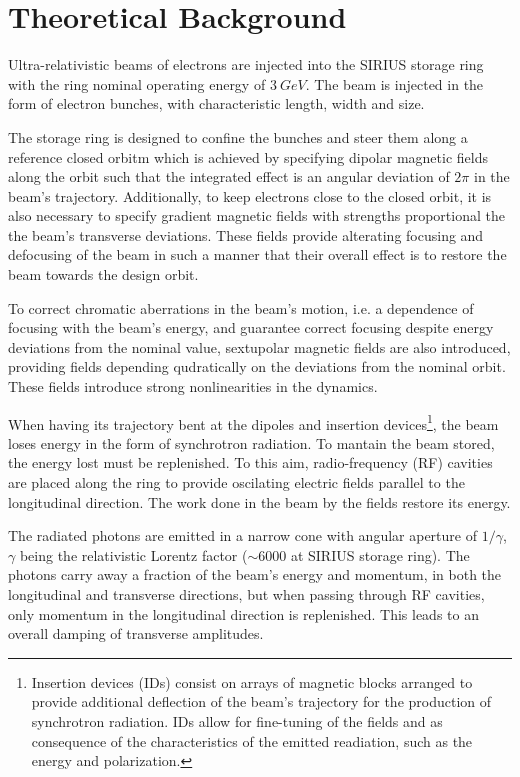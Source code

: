 \chapter{Theoretical Background}

Ultra-relativistic beams of electrons are injected into the SIRIUS storage ring with the ring nominal operating energy of $3~\unit{G eV}$. The beam is injected in the form of electron bunches, with characteristic length, width and size.

The storage ring is designed to confine the bunches and steer them along a reference closed orbitm which is achieved by specifying dipolar magnetic fields along the orbit such that the integrated effect is an angular deviation of $2\pi$ in the beam's trajectory. Additionally, to keep electrons close to the closed orbit, it is also necessary to specify gradient magnetic fields with strengths proportional the the beam's transverse deviations. These fields provide alterating focusing and defocusing of the beam in such a manner that their overall effect is to restore the beam towards the design orbit.

To correct chromatic aberrations in the beam's motion, i.e. a dependence of focusing with the beam's energy, and guarantee correct focusing despite energy deviations from the nominal value, sextupolar magnetic fields are also introduced, providing fields depending qudratically on the deviations from the nominal orbit. These fields introduce strong nonlinearities in the dynamics.

When having its trajectory bent at the dipoles and insertion devices\footnote{Insertion devices (IDs) consist on arrays of magnetic blocks arranged to provide additional deflection of the beam's trajectory for the production of synchrotron radiation. IDs allow for fine-tuning of the fields and as consequence of the characteristics of the emitted readiation, such as the energy and polarization.}, the beam loses energy in the form of synchrotron radiation. To mantain the beam stored, the energy lost must be replenished. To this aim, radio-frequency (RF) cavities are placed along the ring to provide oscilating electric fields parallel to the longitudinal direction. The work done in the beam by the fields restore its energy.

The radiated photons are emitted in a narrow cone with angular aperture of $1/\gamma$, $\gamma$ being the relativistic Lorentz factor ($\sim 6000$ at SIRIUS storage ring). The photons carry away a fraction of the beam's energy and momentum, in both the longitudinal and transverse directions, but when passing through RF cavities, only momentum in the longitudinal direction is replenished. This leads to an overall damping of transverse amplitudes.

